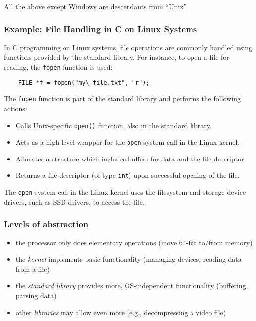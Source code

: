 \documentclass[12pt]{article}
\begin{document}
All the above except Windows are descendants from ``Unix''






\subsubsection{Example: File Handling in C on Linux Systems}
In C programming on Linux systems, file operations are commonly handled using functions provided by the standard library. For instance, to open a file for reading, the \texttt{fopen} function is used:
\begin{verbatim}
    FILE *f = fopen("my\_file.txt", "r");    
\end{verbatim}

The \texttt{fopen} function is part of the standard library and performs the following actions:

\begin{itemize}
    \item Calls Unix-specific \texttt{open()} function, also in the standard library.
    \item Acts as a high-level wrapper for the \texttt{open} system call in the Linux kernel.
    \item Allocates a structure which includes buffers for data and the file descriptor.
    \item Returns a file descriptor (of type \texttt{int}) upon successful opening of the file.
\end{itemize}

The \texttt{open} system call in the Linux kernel uses the filesystem and storage device drivers, such as SSD drivers, to access the file.

\subsubsection{Levels of abstraction}
\begin{itemize}
    \item the processor only does elementary operations (move 64-bit to/from memory)
    \item the \textit{kernel} implements basic functionality (managing devices, reading data from a file)
    \item the \textit{standard library} provides more, OS-independent functionality (buffering, parsing data)
    \item other \textit{libraries} may allow even more (e.g., decompressing a video file)
\end{itemize}
\end{document}
